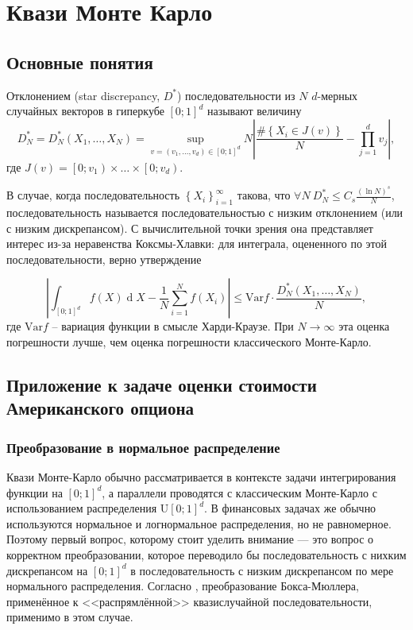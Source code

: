 \documentclass[specialist,
               substylefile = ../spbu.rtx,
               subf,href,colorlinks=true, 12pt]{disser}
\newcommand{\abs}[1]{\left\lvert#1\right\rvert}
\DeclareMathOperator{\dd}{d}
\begin{document}


\chapter{Квази Монте Карло} %
\label{cha:quasi_monte_carlo}

\section{Основные понятия} %
\label{sec:quasi_mc_definition}

Отклонением (star discrepancy, $D^*$) последовательности из $N$ $d$-мерных случайных векторов в гиперкубе $\left[0;1\right]^d$ называют величину
$$D_N^* = D_N^*\left(X_1, \dots, X_N\right) = \sup_{v = (v_1, \dots, v_d) \in \left[0;1\right]^d} N \abs{\frac{\#\left\{ X_i \in J(v) \right\}}{N} - \prod_{j = 1}^d v_j},$$
где $J(v) = \left[0; v_1\right) \times \dots \times \left[0; v_d\right)$.

В случае, когда последовательность $\left\{ X_i\right\}_{i=1}^\infty$ такова, что $\forall N \: D_N^* \leq C_s \frac{(\ln N)^s}{N}$, последовательность называется последовательностью с низким отклонением (или с низким дискрепансом). С вычислительной точки зрения она представляет интерес из-за неравенства Коксмы-Хлавки: для интеграла, оцененного по этой последовательности, верно утверждение

$$\abs{\int_{\left[0;1\right]^d} f(X) \dd X - \frac{1}{N}\sum_{i=1}^N f(X_i)} \leq \mathrm{Var}f\cdot \frac{D_N^*\left(X_1, \dots, X_N\right)}{N},$$
где $\mathrm{Var}f$ -- вариация функции в смысле Харди-Краузе. При $N\to\infty$ эта оценка погрешности лучше, чем оценка погрешности классического Монте-Карло.

\section{Приложение к задаче оценки стоимости Американского опциона} %
\label{sec:monte_carlo_in_option_pricing}

\subsection{Преобразование в нормальное распределение} %
\label{sub:uniform_normal_transform}

Квази Монте-Карло обычно рассматривается в контексте задачи интегрирования функции на $\left[0;1\right]^d$, а параллели проводятся с классическим Монте-Карло с использованием распределения $\mathrm U\left[0;1\right]^d$. В финансовых задачах же обычно используются нормальное и логнормальное распределения, но не равномерное. Поэтому первый вопрос, которому стоит уделить внимание --- это вопрос о корректном преобразовании, которое переводило бы последовательность с нихким дискрепансом на $\left[0;1\right]^d$ в последовательность с низким дискрепансом по мере нормального распределения. Согласно \cite{Oekten2011}, преобразование Бокса-Мюллера, применённое к <<распрямлённой>> квазислучайной последовательности, применимо в этом случае.
\end{document}
